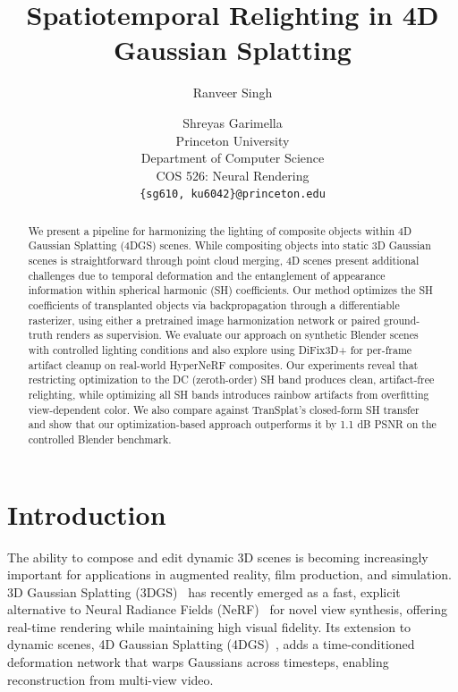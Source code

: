 \documentclass[10pt,twocolumn,letterpaper]{article}
\begin{document}
\title{Spatiotemporal Relighting in 4D Gaussian Splatting}

\author{Ranveer Singh \and Shreyas Garimella\\
Princeton University\\
Department of Computer Science\\
COS 526: Neural Rendering\\
{\tt\small \{sg610, ku6042\}@princeton.edu}
}

\maketitle
\ificcvfinal\thispagestyle{empty}\fi

\begin{abstract}
We present a pipeline for harmonizing the lighting of composite objects within 4D Gaussian Splatting (4DGS) scenes. While compositing objects into static 3D Gaussian scenes is straightforward through point cloud merging, 4D scenes present additional challenges due to temporal deformation and the entanglement of appearance information within spherical harmonic (SH) coefficients. Our method optimizes the SH coefficients of transplanted objects via backpropagation through a differentiable rasterizer, using either a pretrained image harmonization network or paired ground-truth renders as supervision. We evaluate our approach on synthetic Blender scenes with controlled lighting conditions and also explore using DiFix3D+ for per-frame artifact cleanup on real-world HyperNeRF composites. Our experiments reveal that restricting optimization to the DC (zeroth-order) SH band produces clean, artifact-free relighting, while optimizing all SH bands introduces rainbow artifacts from overfitting view-dependent color. We also compare against TranSplat's closed-form SH transfer and show that our optimization-based approach outperforms it by 1.1 dB PSNR on the controlled Blender benchmark.
\end{abstract}

\section{Introduction}

The ability to compose and edit dynamic 3D scenes is becoming increasingly important for applications in augmented reality, film production, and simulation. 3D Gaussian Splatting (3DGS)~\cite{kerbl3Dgaussians} has recently emerged as a fast, explicit alternative to Neural Radiance Fields (NeRF)~\cite{mildenhall2020nerf} for novel view synthesis, offering real-time rendering while maintaining high visual fidelity. Its extension to dynamic scenes, 4D Gaussian Splatting (4DGS)~\cite{wu20244dgaussiansplattingrealtime}, adds a time-conditioned deformation network that warps Gaussians across timesteps, enabling reconstruction from multi-view video.
\end{document}
